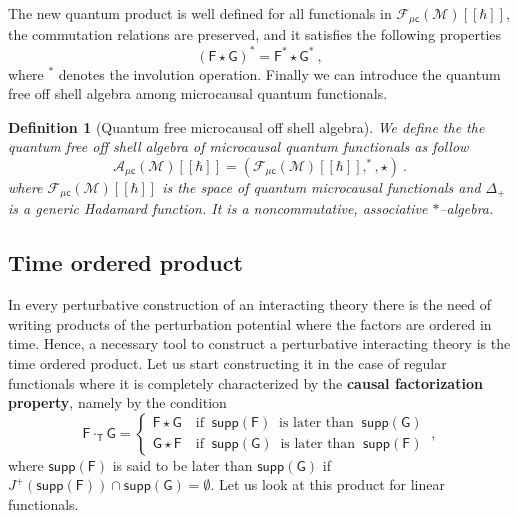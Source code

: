 \documentclass[11pt]{book}
\newcommand{\supp}{\mathsf{supp}}
\newcommand{\muc}{\mu\csf}
\newcommand{\Acal}{\mathcal{A}}
\newcommand{\Fcal}{\mathcal{F}}
\newcommand{\Mcal}{\mathcal{M}}
\newcommand{\Fsf}{\mathsf{F}}
\newcommand{\Gsf}{\mathsf{G}}
\newcommand{\Tsf}{\mathsf{T}}
\newcommand{\csf}{\mathsf{c}}
\theoremstyle{break}
\newtheorem{definition}{Definition}[chapter]
\begin{document}
\bigskip


The new quantum product is well defined for all functionals in $\Fcal_{\muc}(\Mcal)[[\hbar]]$, the commutation relations are preserved, and it satisfies the following properties
%
\begin{equation*}
\left(\Fsf \star \Gsf\right)^\ast = \Fsf^\ast \star \Gsf^\ast \ ,
\end{equation*}
%
where $^\ast$ denotes the involution operation. Finally we can introduce the quantum free off shell algebra among microcausal quantum functionals.


\begin{definition}[Quantum free microcausal off shell algebra]\label{def:alg_q_muc}
We define the the quantum free off shell algebra of microcausal quantum functionals as follow
%
\begin{equation*}
\Acal_{\muc}(\Mcal)[[\hbar]] = \left(\Fcal_{\muc}(\Mcal)[[\hbar]] , ^\ast , \star \right) \ . 
\end{equation*}
%
where $\Fcal_{\muc}(\Mcal)[[\hbar]]$ is the space of quantum microcausal functionals and $\Delta_+$ is a generic Hadamard function. It is a noncommutative, associative $\ast$--algebra. 
\end{definition}


\subsection{Time ordered product}
\label{p:PROD_TIME}


In every perturbative construction of an interacting theory there is the need of writing products of the perturbation potential where the factors are ordered in time. Hence, a necessary tool to construct a perturbative interacting theory is the time ordered product. Let us start constructing it in the case of regular functionals where it is completely characterized by the \textbf{causal factorization property}, namely by the condition
%
\begin{equation}
\Fsf \cdot_\Tsf \Gsf = 
\left\{
\begin{array}{ll}
\Fsf \star \Gsf \quad \mbox{if } \ \supp(\Fsf) \ \mbox{ is later than  } \ \supp(\Gsf)  \\
\Gsf \star \Fsf \quad \mbox{if } \ \supp(\Gsf) \ \mbox{ is later than  } \ \supp(\Fsf) 
\end{array}
\right. \ ,
\label{eq:causal_factorization}
\end{equation}
%
where $\supp(\Fsf)$ is said to be  later than   $\supp(\Gsf)$ if $J^+(\supp(\Fsf)) \cap \supp(\Gsf)=\emptyset$. Let us look at this product for linear functionals.
\end{document}
